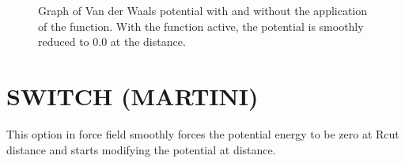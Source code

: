 \documentclass[letterpaper,10pt,english]{sphinxmanual}
\begin{document}
\begin{description}
\begin{figure}[htbp]
\noindent{}
\caption{Graph of Van der Waals potential with and without the application of the  function. With the  function active, the potential is smoothly reduced to 0.0 at the  distance.}\label{\detokenize{vdw_energy:id3}}\end{figure}

\end{description}


\section{SWITCH (MARTINI)}
\label{\detokenize{vdw_energy:switch-martini}}
This option in  force field smoothly forces the potential energy to be zero at Rcut distance and starts modifying the potential at  distance.
\end{document}
